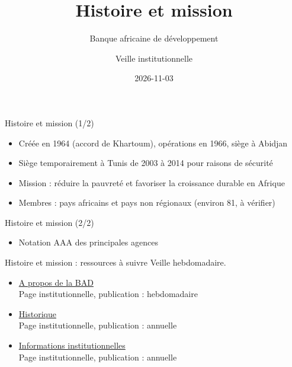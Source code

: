 \documentclass[aspectratio=169,11pt]{beamer}
\title{Histoire et mission}
\subtitle{Banque africaine de développement}
\author{Veille institutionnelle}
\date{2026-11-03}
\begin{document}
\begin{frame}\titlepage\end{frame}

\begin{frame}{Histoire et mission (1/2)}
\begin{itemize}
\item Créée en 1964 (accord de Khartoum), opérations en 1966, siège à Abidjan
\item Siège temporairement à Tunis de 2003 à 2014 pour raisons de sécurité
\item Mission : réduire la pauvreté et favoriser la croissance durable en Afrique
\item Membres : pays africains et pays non régionaux (environ 81, à vérifier)
\end{itemize}
\end{frame}

\begin{frame}{Histoire et mission (2/2)}
\begin{itemize}
\item Notation AAA des principales agences
\end{itemize}
\end{frame}

\begin{frame}{Histoire et mission : ressources à suivre}
\small
Veille hebdomadaire.
\begin{itemize}
\item \href{https://www.afdb.org/en/about-us}{A propos de la BAD}\\{\footnotesize Page institutionnelle, publication : hebdomadaire}
\item \href{https://www.afdb.org/en/about-us/history}{Historique}\\{\footnotesize Page institutionnelle, publication : annuelle}
\item \href{https://www.afdb.org/en/about-us/corporate-information}{Informations institutionnelles}\\{\footnotesize Page institutionnelle, publication : annuelle}
\end{itemize}
\end{frame}
\end{document}
